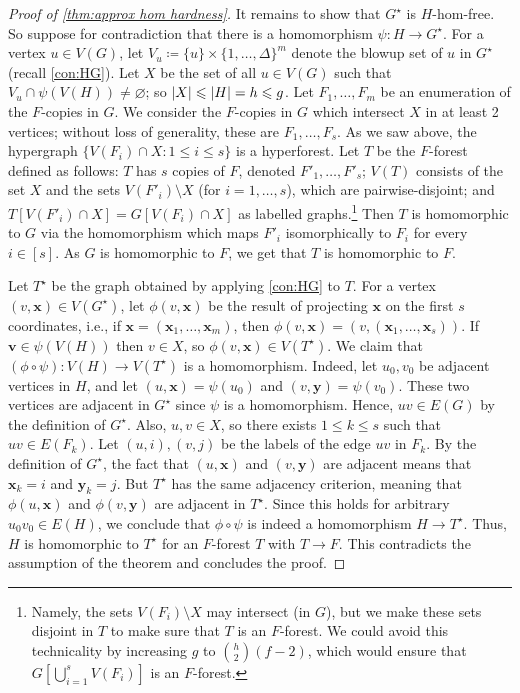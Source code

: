 \documentclass[reqno, english, 12pt]{amsart}
\theoremstyle{plain}
\theoremstyle{remark}
\newcommand{\bx}{\mathbf{x}}
\newcommand{\by}{\mathbf{y}}
\DeclarePairedDelimiter{\abs}{\lvert}{\rvert}
\renewcommand{\emptyset}{\varnothing}
\renewcommand{\leq}{\leqslant}
\begin{document}
\begin{proof}[Proof of \cref{thm:approx hom hardness}]
	It remains to show that $G^{\star}$ is $H$-hom-free. So suppose for contradiction that there is a homomorphism $\psi:H \to G^\star$. 
	For a vertex $u \in V(G)$, let $V_u \coloneqq \{u\} \times \{1,\dots,\Delta\}^m$ denote the blowup set of $u$ in $G^{\star}$ (recall \cref{con:HG}).  
	Let $X$ be the set of all $u \in V(G)$ such that $V_u \cap \psi(V(H)) \neq \emptyset$; so $\abs X \leq \abs H = h \leq g$. 
    Let $F_1,\dots,F_m$ be an enumeration of the $F$-copies in $G$. We consider the $F$-copies in $G$ which intersect $X$ in at least 2 vertices; without loss of generality, these are 
   $F_1,\dots,F_s$. As we saw above, the hypergraph 
    $\{V(F_i) \cap X : 1 \leq i \leq s\}$ is a hyperforest. 
    Let $T$ be the $F$-forest defined as follows: $T$ has $s$ copies of $F$, denoted $F'_1,\dots,F'_s$; $V(T)$ consists of the set $X$ and the sets $V(F'_i) \setminus X$ (for $i = 1,\dots,s$), which are pairwise-disjoint; and $T[V(F'_i) \cap X] = G[V(F_i) \cap X]$ as labelled graphs.\footnote{Namely, the sets $V(F_i)\setminus X$ may intersect (in $G$), but we make these sets disjoint in $T$ to make sure that $T$ is an $F$-forest. We could avoid this technicality by increasing $g$ to $\binom{h}{2}(f-2)$, which would ensure that $G[\bigcup_{i=1}^s V(F_i)]$ is an $F$-forest.}
    Then $T$ is homomorphic to $G$ via the homomorphism which maps $F'_i$ isomorphically to $F_i$ for every $i \in [s]$. As $G$ is homomorphic to $F$, we get that $T$ is homomorphic to $F$.
    
	Let $T^{\star}$ be the graph obtained by applying \cref{con:HG} to $T$. For a vertex $(v,\bx) \in V(G^{\star})$, let $\phi(v,\bx)$ be the result of projecting $\bx$ on the first $s$ coordinates, i.e., if $\bx = (\bx_1,\dots,\bx_m)$, then $\phi(v,\bx) = (v,(\bx_1,\dots,\bx_s))$. If $\mathbf{v} \in \psi(V(H))$ then $v \in X$, so $\phi(v,\bx) \in V(T^{\star})$. We claim that $(\phi \circ \psi) : V(H) \rightarrow V(T^{\star})$ is a homomorphism. Indeed, let $u_0,v_0$ be adjacent vertices in $H$, and let $(u,\bx)=\psi(u_0)$ and $(v,\by) = \psi(v_0)$. These two vertices are adjacent in $G^\star$ since $\psi$ is a homomorphism. Hence, $uv \in E(G)$ by the definition of $G^{\star}$. Also, $u,v \in X$, so there exists 
    $1 \leq k \leq s$ such that $uv \in E(F_k)$. Let $(u,i),(v,j)$ be the labels of the edge $uv$ in $F_k$. By the definition of $G^{\star}$, the fact that $(u,\bx)$ and $(v,\by)$ are adjacent means that $\bx_k = i$ and $\by_k = j$. But $T^{\star}$ has the same adjacency criterion, meaning that $\phi(u,\bx)$ and $\phi(v,\by)$ are adjacent in $T^{\star}$. Since this holds for arbitrary $u_0 v_0 \in E(H)$, we conclude that $\phi \circ \psi$ is indeed a homomorphism $H \to T^\star$. 
    Thus, $H$ is homomorphic to $T^\star$ for an $F$-forest $T$ with $T \rightarrow F$.
    This contradicts the assumption of the theorem and concludes the proof.
	\end{proof}
\end{document}
